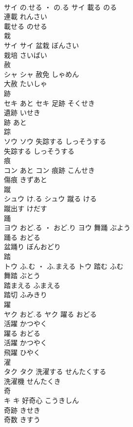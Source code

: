\documentclass[8pt]{extreport}
\begin{document}
\begin{CJK}{UTF8}{min}
\\	サイ	の.せる ・ の.る	サイ	載る	のる	
\\	連載	れんさい	
\\	載せる	のせる	
\\	栽	
\\	サイ		サイ	盆栽	ぼんさい	
\\	栽培	さいばい	
\\	赦	
\\	シャ		シャ	赦免	しゃめん	
\\	大赦	たいしゃ	
\\	跡	
\\	セキ	あと	セキ	足跡	そくせき	
\\	遺跡	いせき	
\\	跡	あと	
\\	踪	
\\	ソウ		ソウ	失踪する	しっそうする	
\\	失踪する	しっそうする	
\\	痕	
\\	コン	あと	コン	痕跡	こんせき	
\\	傷痕	きずあと	
\\	蹴	
\\	シュウ	け.る	シュウ	蹴る	ける	
\\	蹴出す	けだす	
\\	踊	
\\	ヨウ	おど.る ・ おど.り	ヨウ	舞踊	ぶよう	
\\	踊る	おどる	
\\	盆踊り	ぼんおどり	
\\	踏	
\\	トウ	ふ.む ・ ふ.まえる	トウ	踏む	ふむ	
\\	舞踏	ぶとう	
\\	踏まえる	ふまえる	
\\	踏切	ふみきり	
\\	躍	
\\	ヤク	おど.る	ヤク	躍る	おどる	
\\	活躍	かつやく	
\\	躍る	おどる	
\\	活躍	かつやく	
\\	飛躍	ひやく	
\\	濯	
\\	タク		タク	洗濯する	せんたくする	
\\	洗濯機	せんたくき	
\\	奇	
\\	キ		キ	好奇心	こうきしん	
\\	奇跡	きせき	
\\	奇数	きすう	

\end{CJK}
\end{document}
